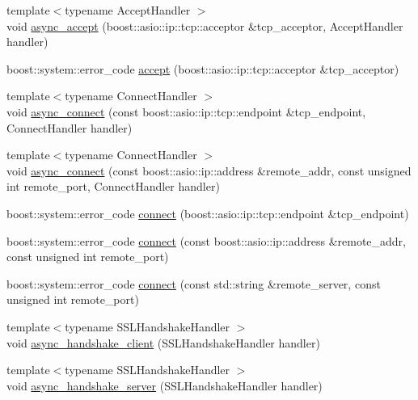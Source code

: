 \begin{DoxyCompactItemize}
{\footnotesize template$<$typename Accept\-Handler $>$ }\\void \hyperlink{classpion_1_1tcp_1_1connection_a36dfc649870d90674938ab27feb16275}{async\-\_\-accept} (boost\-::asio\-::ip\-::tcp\-::acceptor \&tcp\-\_\-acceptor, Accept\-Handler handler)
\item 
boost\-::system\-::error\-\_\-code \hyperlink{classpion_1_1tcp_1_1connection_a5939637bc376552349938e2be4c72188}{accept} (boost\-::asio\-::ip\-::tcp\-::acceptor \&tcp\-\_\-acceptor)
\item 
{\footnotesize template$<$typename Connect\-Handler $>$ }\\void \hyperlink{classpion_1_1tcp_1_1connection_ad447a01394c31bb04b20386f4613b465}{async\-\_\-connect} (const boost\-::asio\-::ip\-::tcp\-::endpoint \&tcp\-\_\-endpoint, Connect\-Handler handler)
\item 
{\footnotesize template$<$typename Connect\-Handler $>$ }\\void \hyperlink{classpion_1_1tcp_1_1connection_ae8fe3fe2b885ff3a192e99b735ddea4c}{async\-\_\-connect} (const boost\-::asio\-::ip\-::address \&remote\-\_\-addr, const unsigned int remote\-\_\-port, Connect\-Handler handler)
\item 
boost\-::system\-::error\-\_\-code \hyperlink{classpion_1_1tcp_1_1connection_a5b183b3389ab9edfe28dbc7eaf352304}{connect} (boost\-::asio\-::ip\-::tcp\-::endpoint \&tcp\-\_\-endpoint)
\item 
boost\-::system\-::error\-\_\-code \hyperlink{classpion_1_1tcp_1_1connection_afd4930565752d4cfc1ea789ca3e87597}{connect} (const boost\-::asio\-::ip\-::address \&remote\-\_\-addr, const unsigned int remote\-\_\-port)
\item 
boost\-::system\-::error\-\_\-code \hyperlink{classpion_1_1tcp_1_1connection_ac80e46e81863a02840a25a3e2ef71b3b}{connect} (const std\-::string \&remote\-\_\-server, const unsigned int remote\-\_\-port)
\item 
{\footnotesize template$<$typename S\-S\-L\-Handshake\-Handler $>$ }\\void \hyperlink{classpion_1_1tcp_1_1connection_ab7262017bec6c8ce7dbb811d572958b5}{async\-\_\-handshake\-\_\-client} (S\-S\-L\-Handshake\-Handler handler)
\item 
{\footnotesize template$<$typename S\-S\-L\-Handshake\-Handler $>$ }\\void \hyperlink{classpion_1_1tcp_1_1connection_a177ca42941a50e49396b2ec330e251bf}{async\-\_\-handshake\-\_\-server} (S\-S\-L\-Handshake\-Handler handler)
\item 

\end{DoxyCompactItemize}
